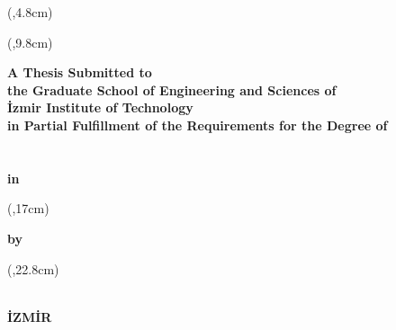 \thispagestyle{empty}

\begin{center}
	\begin{textblock*}{\textwidth}(\TextBlockCenter,4.8cm)
		\textbf{\fontsize{18pt}{27pt}\selectfont\MakeUppercase\ThesisTitle}
	\end{textblock*}

	\begin{textblock*}{\textwidth}(\TextBlockCenter,9.8cm)
		\begin{spacing}{1}
			{\fontsize{14}{16}\bf
				A Thesis Submitted to\\
				the Graduate School of Engineering and Sciences of\\
				İzmir Institute of Technology\\
				in Partial Fulfillment of the Requirements for the Degree of\\
				~\\
				~\\
				in \DepartmentName
			}
		\end{spacing}
	\end{textblock*}

	\begin{textblock*}{\textwidth}(\TextBlockCenter,17cm)
		\begin{spacing}{1}
			{\fontsize{14}{16}\bf
				by\\
				\AuthorName{ }\MakeUppercase\AuthorSurname
			}
		\end{spacing}
	\end{textblock*}

	\begin{textblock*}{\textwidth}(\TextBlockCenter,22.8cm)
		\begin{spacing}{1}
			{\fontsize{14}{16}\bf
			\DefenceMonth{ }\DefenceYear\\
				İZMİR
			}
		\end{spacing}
	\end{textblock*}
\end{center}

~\pagebreak
